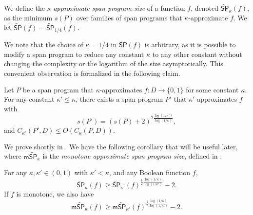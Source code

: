 \documentclass{toc}
\begin{document}
\begin{definition}\label{def:approx-SP}
We define the $\kappa$-\emph{approximate span program size} of a function $f$, denoted $\widetilde{\mathsf{SP}}_{\kappa}(f)$, as the minimum $s(P)$ over families of span programs that $\kappa$-approximate $f$. We let $\widetilde{\mathsf{SP}}(f)=\widetilde{\mathsf{SP}}_{1/4}(f)$. 
\end{definition}
We note that the choice of $\kappa=1/4$ in $\widetilde{\mathsf{SP}}(f)$ is arbitrary, as it is possible to modify a span program to reduce any constant $\kappa$ to any other constant without changing the complexity or the logarithm of the size asymptotically. This convenient observation is formalized in the following claim.



\begin{claim}\label{claim:kappa}
  Let $P$ be a span program that $\kappa$-approximates $f:D\rightarrow\{0,1\}$ for some constant $\kappa$. For any constant $\kappa'\leq \kappa$, there exists a span program $P'$ that $\kappa'$-approximates $f$ with
%
%
\begin{equation}  
%
%
 s(P')=(s(P)+2)^{2\frac{\log(1/\kappa')}{\log(1/\kappa)}},   %
\end{equation}
and $C_{\kappa'}(P',D)\leq O\left(C_\kappa(P,D)\right)$. 
\end{claim}

%
%
We prove  shortly in . %
We have the following corollary that will be useful later, where $\mathsf{m}\widetilde{\mathsf{SP}}_\kappa$ is the \emph{monotone approximate span program size}, defined in :
\begin{corollary}\label{cor:kappa}
For any $\kappa,\kappa'\in (0,1)$ with $\kappa'<\kappa$, and any Boolean function $f$,
$$\widetilde{\mathsf{SP}}_{\kappa}(f)\geq \widetilde{\mathsf{SP}}_{\kappa'}(f)^{\frac{1}{2}\frac{\log(1/\kappa)}{\log(1/\kappa')}}-2.$$
If $f$ is monotone, we also have
$$\mathsf{m}\widetilde{\mathsf{SP}}_{\kappa}(f)\geq \mathsf{m}\widetilde{\mathsf{SP}}_{\kappa'}(f)^{\frac{1}{2}\frac{\log(1/\kappa)}{\log(1/\kappa')}}-2.$$
\end{corollary}
\end{document}
